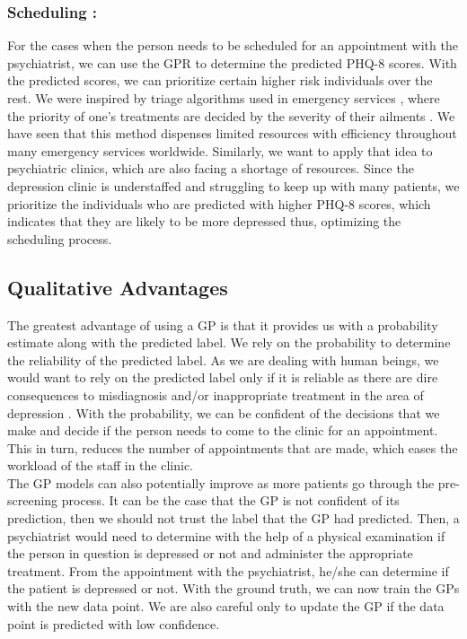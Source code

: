 \documentclass{article}
\begin{document}
    \subsubsection{Scheduling :}
    For the cases when the person needs to be scheduled for an appointment with the psychiatrist, we can use the GPR to determine the predicted PHQ-8 scores. 
    With the predicted scores, we can prioritize certain higher risk individuals over the rest. 
    We were inspired by triage algorithms used in emergency services \cite{shah2015managing,oredsson2011systematic}, where the priority of one's treatments are decided by the severity of their ailments \cite{wiki:Triage}.
    We have seen that this method dispenses limited resources with efficiency \cite{rosedale2011effectiveness} throughout many emergency services worldwide. 
    Similarly, we want to apply that idea to psychiatric clinics, which are also facing a shortage of resources. 
    Since the depression clinic is understaffed and struggling to keep up with many patients, we prioritize the individuals who are predicted with higher PHQ-8 scores, which indicates that they are likely to be more depressed thus, optimizing the scheduling process.
    
    \subsection{Qualitative Advantages}
The greatest advantage of using a GP is that it provides us with a probability estimate along with the predicted label. 
    We rely on the probability to determine the reliability of the predicted label. 
    As we are dealing with human beings, we would want to rely on the predicted label only if it is reliable as there are dire consequences to misdiagnosis and/or inappropriate treatment in the area of depression \cite{nasrallah2015consequences,bowden2001strategies,dunner2003clinical}. 
    With the probability, we can be confident of the decisions that we make and decide if the person needs to come to the clinic for an appointment. 
    This in turn, reduces the number of appointments that are made, which eases the workload of the staff in the clinic. \\
    
    The GP models can also potentially improve as more patients go through the pre-screening process.
    It can be the case that the GP is not confident of its prediction, then we should not trust the label that the GP had predicted. 
    Then, a psychiatrist would need to determine with the help of a physical examination if the person in question is depressed or not and administer the appropriate treatment. 
    From the appointment with the psychiatrist, he/she can determine if the patient is depressed or not. 
    With the ground truth, we can now train the GPs with the new data point. 
    We are also careful only to update the GP if the data point is predicted with low confidence. \\
\end{document}
